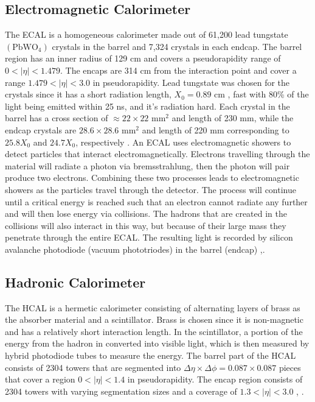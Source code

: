 \subsection{Electromagnetic Calorimeter}
\label{sec:ECAL}

The ECAL is a homogeneous calorimeter made out of 61,200 lead tungstate $(\text{PbWO}_4)$ crystals in the barrel and 7,324 crystals in each endcap. The barrel region has an inner radius of 129 cm and covers a pseudorapidity range of $0<|\eta|<1.479$. The encaps are 314 cm from the interaction point and cover a range $1.479<|\eta|<3.0$ in pseudorapidity. Lead tungstate was chosen for the crystals since it has a short radiation length, $X_0=0.89 \text{ cm }$, fast with 80\% of the light being emitted within 25 ns, and it's radiation hard. Each crystal in the barrel has a cross section of $\approx22\times22 \text{ mm}^2$ and length of 230 mm, while the endcap crystals are $28.6\times28.6 \text{ mm}^2$ and length of 220 mm corresponding to $25.8X_0$ and $24.7X_0$, respectively \cite{noauthor_cms_1997}. An ECAL uses electromagnetic showers to detect particles that interact electromagnetically. Electrons travelling through the material will radiate a photon via bremsstrahlung, then the photon will pair produce two electrons. Combining these two processes leads to electromagnetic showers as the particles travel through the detector. The process will continue until a critical energy is reached such that an electron cannot radiate any further and will then lose energy via collisions. The hadrons that are created in the collisions will also interact in this way, but because of their large mass they penetrate through the entire ECAL. The resulting light is recorded by silicon avalanche photodiode (vacuum phototriodes) in the barrel (endcap) \cite{noauthor_cms_1997},\cite{collaboration_cms_2007}. 

\subsection{Hadronic Calorimeter}
\label{sec:HCAL}

The HCAL is a hermetic calorimeter consisting of alternating layers of brass as the absorber material and a scintillator. Brass is chosen since it is non-magnetic and has a relatively short interaction length. In the scintillator, a portion of the energy from the hadron in converted into visible light, which is then measured by hybrid photodiode tubes to measure the energy. The barrel part of the HCAL consists of 2304 towers that are segmented into $\Delta\eta\times\Delta\phi=0.087\times0.087$ pieces that cover a region $0<|\eta|<1.4$ in pseudorapidity. The encap region consists of 2304 towers with varying segmentation sizes and a coverage of $1.3<|\eta|<3.0$ \cite{noauthor_cms_1997-1}, \cite{collaboration_cms_2007}. 

